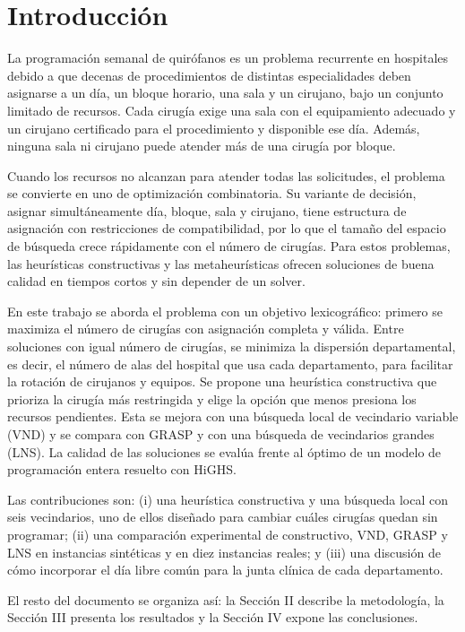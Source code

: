\section{Introducción}
\label{sec:introduction}
La programación semanal de quirófanos es un problema recurrente en hospitales debido a que decenas de procedimientos de distintas especialidades deben asignarse a un día, un bloque horario, una sala y un cirujano, bajo un conjunto limitado de recursos. Cada cirugía exige una sala con el equipamiento adecuado y un cirujano certificado para el procedimiento y disponible ese día. Además, ninguna sala ni cirujano puede atender más de una cirugía por bloque.

Cuando los recursos no alcanzan para atender todas las solicitudes, el problema se convierte en uno de optimización combinatoria. Su variante de decisión, asignar simultáneamente día, bloque, sala y cirujano, tiene estructura de asignación con restricciones de compatibilidad, por lo que el tamaño del espacio de búsqueda crece rápidamente con el número de cirugías. Para estos problemas, las heurísticas constructivas y las metaheurísticas ofrecen soluciones de buena calidad en tiempos cortos y sin depender de un solver.

En este trabajo se aborda el problema con un objetivo lexicográfico: primero se maximiza el número de cirugías con asignación completa y válida. Entre soluciones con igual número de cirugías, se minimiza la dispersión departamental, es decir, el número de alas del hospital que usa cada departamento, para facilitar la rotación de cirujanos y equipos. Se propone una heurística constructiva que prioriza la cirugía más restringida y elige la opción que menos presiona los recursos pendientes. Esta se mejora con una búsqueda local de vecindario variable (VND) y se compara con GRASP y con una búsqueda de vecindarios grandes (LNS). La calidad de las soluciones se evalúa frente al óptimo de un modelo de programación entera resuelto con HiGHS.

Las contribuciones son: (i) una heurística constructiva y una búsqueda local con seis vecindarios, uno de ellos diseñado para cambiar cuáles cirugías quedan sin programar; (ii) una comparación experimental de constructivo, VND, GRASP y LNS en instancias sintéticas y en diez instancias reales; y (iii) una discusión de cómo incorporar el día libre común para la junta clínica de cada departamento.

El resto del documento se organiza así: la Sección II describe la metodología, la Sección III presenta los resultados y la Sección IV expone las conclusiones.

